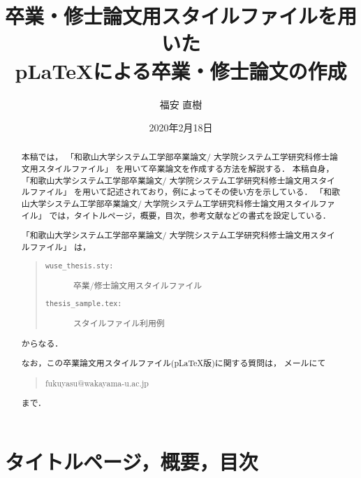 \documentclass[11pt]{jreport}
\title{卒業・修士論文用スタイルファイルを用いた\\
       p\LaTeX による卒業・修士論文の作成}
\author{福安 直樹}
\date{2020年2月18日}	%
\begin{document}
\maketitle

\begin{abstract}
本稿では，
「和歌山大学システム工学部卒業論文/
  大学院システム工学研究科修士論文用スタイルファイル」
を用いて卒業論文を作成する方法を解説する．
本稿自身，
「和歌山大学システム工学部卒業論文/
  大学院システム工学研究科修士論文用スタイルファイル」
を用いて記述されており，例によってその使い方を示している．
「和歌山大学システム工学部卒業論文/
  大学院システム工学研究科修士論文用スタイルファイル」
では，タイトルページ，概要，目次，参考文献などの書式を設定している．

「和歌山大学システム工学部卒業論文/
  大学院システム工学研究科修士論文用スタイルファイル」
は，
\begin{quote}
  \begin{description}
    \item[\tt wuse\_thesis.sty:] 卒業/修士論文用スタイルファイル
    \item[\tt thesis\_sample.tex:] スタイルファイル利用例
  \end{description}
\end{quote}
からなる．

なお，この卒業論文用スタイルファイル(p\LaTeX 版)に関する質問は，
メールにて
\begin{quote}
fukuyasu@wakayama-u.ac.jp
\end{quote}
まで．

\end{abstract}

\tableofcontents



\newpage
{}	%



\chapter{タイトルページ，概要，目次}
\end{document}
